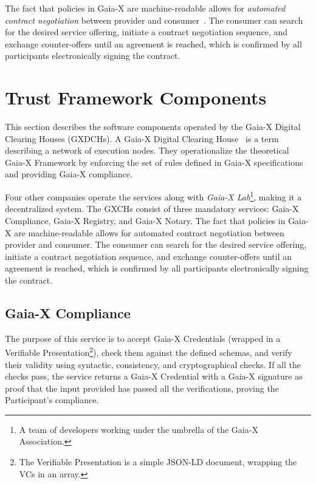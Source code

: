 The fact that policies in Gaia-X are machine-readable allows for \textit{automated contract negotiation} between provider and consumer~\cite{gaiax_data_exchange_document}.
The consumer can search for the desired service offering, initiate a contract negotiation sequence, and exchange counter-offers until an agreement is reached, which is confirmed by all participants electronically signing the contract.

\section{Trust Framework Components}\label{sec:trust-framework-components}

This section describes the software components operated by the Gaia-X Digital Clearing Houses (GXDCHs).
A Gaia-X Digital Clearing House~\cite{gaiax} is a term describing a network of execution nodes.
They operationalize the theoretical Gaia-X Framework by enforcing the set of rules defined in Gaia-X specifications and providing Gaia-X compliance.

Four other companies operate the services along with \textit{Gaia-X Lab}\footnote{A team of developers working under the umbrella of the Gaia-X Association.}, making it a decentralized system.
The GXCHs consist of three mandatory services: Gaia-X Compliance, Gaia-X Registry, and Gaia-X Notary.
The fact that policies in Gaia-X are machine-readable allows for automated contract negotiation between provider and consumer.
The consumer can search for the desired service offering, initiate a contract negotiation sequence, and exchange counter-offers until an agreement is reached, which is confirmed by all participants electronically signing the contract.

\subsection{Gaia-X Compliance}\label{subsec:gaia-x-compliance}

The purpose of this service is to accept Gaia-X Credentials (wrapped in a Verifiable Presentation\footnote{The Verifiable Presentation is a simple JSON-LD document, wrapping the VCs in an array.}), check them against the defined schemas, and verify their validity using syntactic, consistency, and cryptographical checks.
If all the checks pass, the service returns a Gaia-X Credential with a Gaia-X signature as proof that the input provided has passed all the verifications, proving the Participant's compliance.

